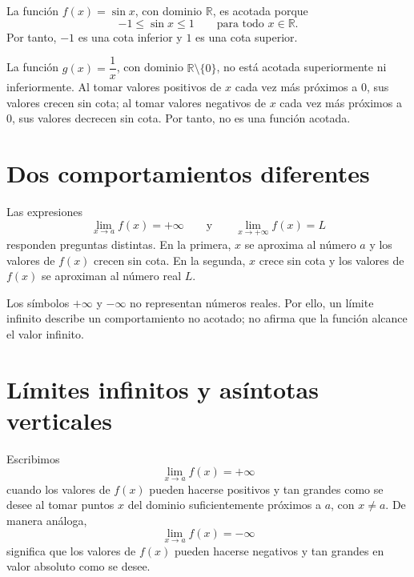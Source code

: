 \documentclass[10pt,a5paper]{article}
\begin{document}
\begin{ejemplo}
La función $f(x)=\sin x$, con dominio $\mathbb{R}$, es acotada porque
\[
  -1\leq\sin x\leq1\qquad\text{para todo }x\in\mathbb{R}.
\]
Por tanto, $-1$ es una cota inferior y $1$ es una cota superior.
\end{ejemplo}

\begin{ejemplo}
La función $g(x)=\dfrac{1}{x}$, con dominio $\mathbb{R}\setminus\{0\}$, no está acotada superiormente ni inferiormente. Al tomar valores positivos de $x$ cada vez más próximos a $0$, sus valores crecen sin cota; al tomar valores negativos de $x$ cada vez más próximos a $0$, sus valores decrecen sin cota. Por tanto, no es una función acotada.
\end{ejemplo}

\section*{Dos comportamientos diferentes}

Las expresiones
\[
  \lim_{x\to a}f(x)=+\infty
  \qquad\text{y}\qquad
  \lim_{x\to+\infty}f(x)=L
\]
responden preguntas distintas. En la primera, $x$ se aproxima al número $a$ y los valores de $f(x)$ crecen sin cota. En la segunda, $x$ crece sin cota y los valores de $f(x)$ se aproximan al número real $L$.

\begin{nota}
Los símbolos $+\infty$ y $-\infty$ no representan números reales. Por ello, un límite infinito describe un comportamiento no acotado; no afirma que la función alcance el valor infinito.
\end{nota}

\section*{Límites infinitos y asíntotas verticales}

\begin{definicion}
Escribimos
\[
  \lim_{x\to a}f(x)=+\infty
\]
cuando los valores de $f(x)$ pueden hacerse positivos y tan grandes como se desee al tomar puntos $x$ del dominio suficientemente próximos a $a$, con $x\neq a$. De manera análoga,
\[
  \lim_{x\to a}f(x)=-\infty
\]
significa que los valores de $f(x)$ pueden hacerse negativos y tan grandes en valor absoluto como se desee.
\end{definicion}
\end{document}
